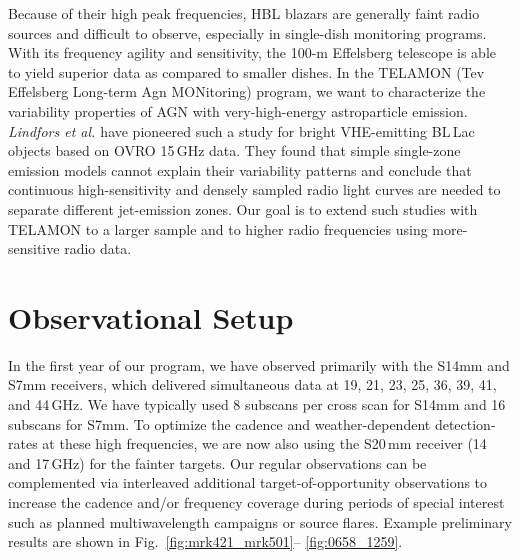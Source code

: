 \documentclass[a4paper,11pt]{article}
\begin{document}
Because of their high peak frequencies, HBL blazars are generally faint radio sources and difficult to observe, especially in single-dish monitoring programs. 
With its frequency agility and sensitivity, the 100-m Effelsberg telescope is able to yield superior data as compared to smaller dishes. 
In the TELAMON (Tev Effelsberg Long-term Agn MONitoring) program, we want to characterize the variability properties of AGN with very-high-energy astroparticle emission. 
\textsl{Lindfors et al. \cite{Lindfors2016}} have pioneered such a study for bright VHE-emitting BL\,Lac objects based on OVRO 15\,GHz data. They found that simple single-zone emission models cannot explain their variability patterns and conclude that continuous high-sensitivity and densely sampled radio light curves are needed to separate different jet-emission zones. Our goal is to extend such studies with TELAMON to a larger sample and to higher radio frequencies using more-sensitive radio data. 


\section{Observational Setup}
\noindent
In the first year of our program, we have observed primarily with the S14mm and S7mm receivers, which delivered simultaneous data at 19, 21, 23, 25, 36, 39, 41, and 44\,GHz. 
We have typically used 8 subscans per cross scan for S14mm and 16 subscans for S7mm. 
To optimize the cadence and weather-dependent detection-rates at these high frequencies, we are now also using the S20\,mm receiver (14 and 17\,GHz) for the fainter targets.
Our regular observations can be complemented via interleaved additional target-of-opportunity observations to increase the cadence and/or frequency coverage during periods of special interest such as planned multiwavelength campaigns or source flares.
Example preliminary results are shown in Fig.~\ref{fig:mrk421_mrk501}-- \ref{fig:0658_1259}.
\end{document}
